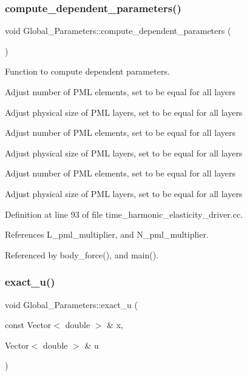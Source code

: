 \subsubsection{\texorpdfstring{compute\+\_\+dependent\+\_\+parameters()}{compute\_dependent\_parameters()}}
{\footnotesize\ttfamily void Global\+\_\+\+Parameters\+::compute\+\_\+dependent\+\_\+parameters (\begin{DoxyParamCaption}{ }\end{DoxyParamCaption})}



Function to compute dependent parameters. 

Adjust number of P\+ML elements, set to be equal for all layers

Adjust physical size of P\+ML layers, set to be equal for all layers

Adjust number of P\+ML elements, set to be equal for all layers

Adjust physical size of P\+ML layers, set to be equal for all layers

Adjust number of P\+ML elements, set to be equal for all layers

Adjust physical size of P\+ML layers, set to be equal for all layers 

Definition at line 93 of file time\+\_\+harmonic\+\_\+elasticity\+\_\+driver.\+cc.



References L\+\_\+pml\+\_\+multiplier, and N\+\_\+pml\+\_\+multiplier.



Referenced by body\+\_\+force(), and main().

\mbox{\label{namespaceGlobal__Parameters_a97162dba4bd29a15067b9c9bbe53c754}} 
\subsubsection{\texorpdfstring{exact\+\_\+u()}{exact\_u()}}
{\footnotesize\ttfamily void Global\+\_\+\+Parameters\+::exact\+\_\+u (\begin{DoxyParamCaption}\item[{const Vector$<$ double $>$ \&}]{x,  }\item[{Vector$<$ double $>$ \&}]{u }\end{DoxyParamCaption})}



